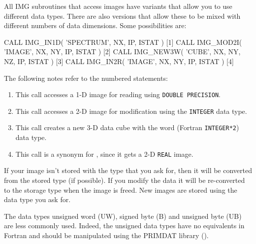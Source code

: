 \documentclass[twoside,11pt,nolof]{starlink}
\providecommand{\myverb}[1]{{\texttt{#1}}}
\providecommand{\mynote}{The following notes refer to the numbered statements:}
\newenvironment{code}{\begin{small}}
                     {\end{small}}
\newenvironment{enumnotes}
{
   \renewcommand{\labelenumi}{\myverb{[\theenumi]}}
   \begin{enumerate}
}{
   \end{enumerate}
   \renewcommand{\labelenumi}{\theenumi}
}
\begin{document}
All IMG subroutines that access images have variants that allow you to
use different data types. There are also versions that allow these to
be mixed with different numbers of data dimensions. Some possibilities
are:
\begin{code}
\begin{terminalv}
      CALL IMG_IN1D( 'SPECTRUM', NX, IP, ISTAT )              [1]
      CALL IMG_MOD2I( 'IMAGE', NX, NY, IP, ISTAT )            [2]
      CALL IMG_NEW3W( 'CUBE', NX, NY, NZ, IP, ISTAT )         [3]
      CALL IMG_IN2R( 'IMAGE', NX, NY, IP, ISTAT )             [4]
\end{terminalv}
\end{code}
\mynote
\begin{enumnotes}
\item This call accesses a 1-D image for reading using \myverb{DOUBLE
PRECISION}.

\item This call accesses a 2-D image for modification using the
\myverb{INTEGER} data type.

\item This call creates a new 3-D data cube with the word (Fortran
\myverb{INTEGER*2}) data type.

\item This call is a synonym for \htmlref{\myverb{IMG\_IN}}{IMG_IN[n][x]}, since it gets a 2-D
\myverb{REAL} image.
\end{enumnotes}

If your image isn't stored with the type that you ask for, then it
will be converted from the stored type (if possible). If you modify
the data it will be re-converted to the storage type when the image is
freed.  New images are stored using the data type you ask for.

The data types unsigned word (UW), signed byte (B) and unsigned byte
(UB) are less commonly used. Indeed, the unsigned data types have no
equivalents in Fortran and should be manipulated using the
PRIMDAT library ().
\end{document}
